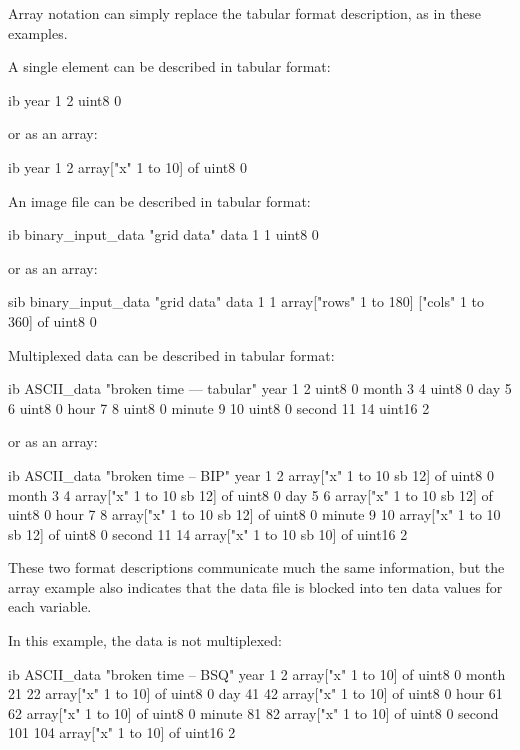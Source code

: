 Array notation can simply replace the tabular format description, as
in these examples.

A single element can be described in tabular format: 

\begin{vcode}{ib}
year 1 2 uint8 0  
\end{vcode}

or as an array: 

\begin{vcode}{ib}
year 1 2 array["x" 1 to 10] of uint8 0  
\end{vcode}

An image file can be described in tabular format: 

\begin{vcode}{ib}
binary_input_data "grid data"
data 1 1 uint8 0 
\end{vcode}

or as an array: 

\begin{vcode}{sib}
binary_input_data "grid data"
data 1 1 array["rows" 1 to 180] ["cols" 1 to 360] of uint8 0 
\end{vcode}

Multiplexed data can be described in tabular format: 

\begin{vcode}{ib}
ASCII_data "broken time --- tabular" 
year 1 2 uint8 0 
month 3 4 uint8 0 
day 5 6 uint8 0 
hour 7 8 uint8 0 
minute 9 10 uint8 0 
second 11 14 uint16 2  
\end{vcode}

or as an array:

\begin{vcode}{ib}
ASCII_data "broken time -- BIP" 
year 1 2 array["x" 1 to 10 sb 12] of uint8 0 
month 3 4 array["x" 1 to 10 sb 12] of uint8 0 
day 5 6 array["x" 1 to 10 sb 12] of uint8 0 
hour 7 8 array["x" 1 to 10 sb 12] of uint8 0 
minute 9 10 array["x" 1 to 10 sb 12] of uint8 0 
second 11 14 array["x" 1 to 10 sb 10] of uint16 2  
\end{vcode}

These two format descriptions communicate much the same information,
but the array example also indicates that the data file is blocked
into ten data values for each variable.

In this example, the data is not multiplexed: 

\begin{vcode}{ib}
ASCII_data "broken time -- BSQ" 
year 1 2 array["x" 1 to 10] of uint8 0 
month 21 22 array["x" 1 to 10] of uint8 0 
day 41 42 array["x" 1 to 10] of uint8 0 
hour 61 62 array["x" 1 to 10] of uint8 0 
minute 81 82 array["x" 1 to 10] of uint8 0 
second 101 104 array["x" 1 to 10] of uint16 2  
\end{vcode}

